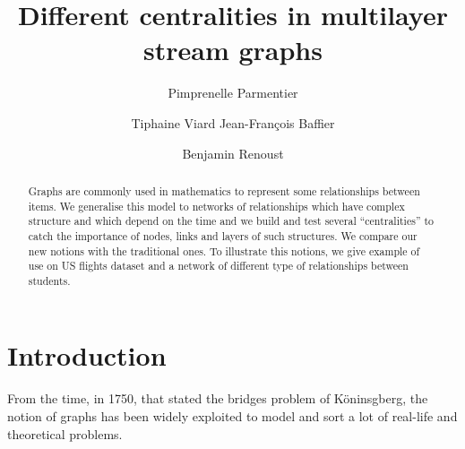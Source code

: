 \documentclass{svproc}
\begin{document}
\mainmatter              %
%
\title{Different centralities in multilayer stream graphs}
%
%
\author{Pimprenelle Parmentier \and Tiphaine Viard
Jean-François Baffier \and Benjamin Renoust}
%
%
%

\maketitle              %

\begin{abstract}
Graphs are commonly used in mathematics to represent some relationships between items. We generalise this model to networks of relationships which have complex structure and which depend on the time and we build and test several ``centralities'' to catch the importance of nodes, links and layers of such structures. We compare our new notions with the traditional ones. To illustrate this notions, we give example of use on US flights dataset and a network of different type of relationships between students.
\end{abstract}
%

\section{Introduction}
%
From the time, in 1750, that stated the bridges problem of Köninsgberg, the notion of graphs has been widely exploited to model and sort a lot of real-life and theoretical problems.
\end{document}

